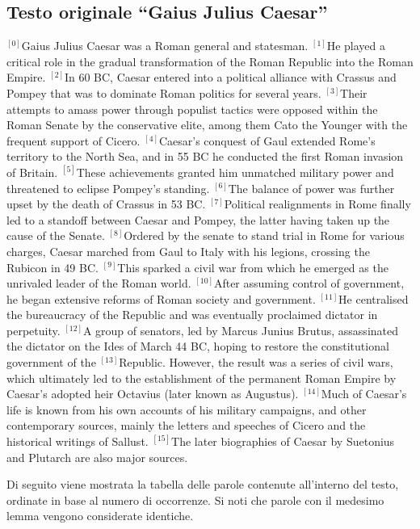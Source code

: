 \begin{small}
\subsection*{Testo originale ``Gaius Julius Caesar''}
{$^{[0]}$}Gaius Julius Caesar was a Roman general and statesman. 
{$^{[1]}$}He played a critical role in the gradual transformation of the Roman Republic into the Roman Empire.
{$^{[2]}$}In 60 BC, Caesar entered into a political alliance with Crassus and Pompey that was to dominate Roman politics for several years. 
{$^{[3]}$}Their attempts to amass power through populist tactics were opposed within the Roman Senate by the conservative elite, among them Cato the Younger with the frequent support of Cicero. 
{$^{[4]}$}Caesar's conquest of Gaul extended Rome's territory to the North Sea, and in 55 BC he conducted the first Roman invasion of Britain. 
{$^{[5]}$}These achievements granted him unmatched military power and threatened to eclipse Pompey's standing. 
{$^{[6]}$}The balance of power was further upset by the death of Crassus in 53 BC. 
{$^{[7]}$}Political realignments in Rome finally led to a standoff between Caesar and Pompey, the latter having taken up the cause of the Senate. 
{$^{[8]}$}Ordered by the senate to stand trial in Rome for various charges, Caesar marched from Gaul to Italy with his legions, crossing the Rubicon in 49 BC. 
{$^{[9]}$}This sparked a civil war from which he emerged as the unrivaled leader of the Roman world.
{$^{[10]}$}After assuming control of government, he began extensive reforms of Roman society and government. 
{$^{[11]}$}He centralised the bureaucracy of the Republic and was eventually proclaimed dictator in perpetuity. 
{$^{[12]}$}A group of senators, led by Marcus Junius Brutus, assassinated the dictator on the Ides of March 44 BC, hoping to restore the constitutional government of the {$^{[13]}$}Republic. However, the result was a series of civil wars, which ultimately led to the establishment of the permanent Roman Empire by Caesar's adopted heir Octavius (later known as Augustus). 
{$^{[14]}$}Much of Caesar's life is known from his own accounts of his military campaigns, and other contemporary sources, mainly the letters and speeches of Cicero and the historical writings of Sallust. 
{$^{[15]}$}The later biographies of Caesar by Suetonius and Plutarch are also major sources.
\vfill
\end{small}

\newpage
Di seguito viene mostrata la tabella delle parole contenute all'interno del testo,
ordinate in base al numero di occorrenze.
Si noti che parole con il medesimo lemma vengono considerate identiche.

